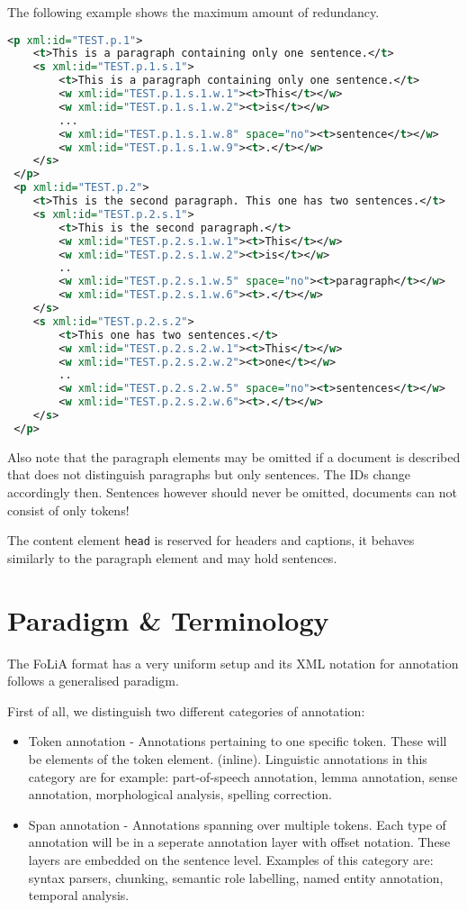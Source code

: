 \documentclass[a4paper,12pt]{report}
\begin{document}
The following example shows the maximum amount of redundancy.

\begin{lstlisting}[language=xml]
 <p xml:id="TEST.p.1">
    <t>This is a paragraph containing only one sentence.</t>
    <s xml:id="TEST.p.1.s.1">        
        <t>This is a paragraph containing only one sentence.</t>
        <w xml:id="TEST.p.1.s.1.w.1"><t>This</t></w>
        <w xml:id="TEST.p.1.s.1.w.2"><t>is</t></w>
        ...
        <w xml:id="TEST.p.1.s.1.w.8" space="no"><t>sentence</t></w>
        <w xml:id="TEST.p.1.s.1.w.9"><t>.</t></w>
    </s>
 </p>
 <p xml:id="TEST.p.2">
    <t>This is the second paragraph. This one has two sentences.</t>
    <s xml:id="TEST.p.2.s.1">
        <t>This is the second paragraph.</t>
        <w xml:id="TEST.p.2.s.1.w.1"><t>This</t></w>
        <w xml:id="TEST.p.2.s.1.w.2"><t>is</t></w>    
        ..
        <w xml:id="TEST.p.2.s.1.w.5" space="no"><t>paragraph</t></w>    
        <w xml:id="TEST.p.2.s.1.w.6"><t>.</t></w>    
    </s>
    <s xml:id="TEST.p.2.s.2">
        <t>This one has two sentences.</t>
        <w xml:id="TEST.p.2.s.2.w.1"><t>This</t></w>
        <w xml:id="TEST.p.2.s.2.w.2"><t>one</t></w>    
        ..
        <w xml:id="TEST.p.2.s.2.w.5" space="no"><t>sentences</t></w>    
        <w xml:id="TEST.p.2.s.2.w.6"><t>.</t></w>    
    </s>
 </p>
\end{lstlisting}

Also note that the paragraph elements may be omitted if a document is described that does not distinguish paragraphs but only sentences. The IDs change accordingly then. Sentences however should never be omitted, documents can not consist of only tokens!

The content element \texttt{head} is reserved for headers and captions, it behaves similarly to the paragraph element and may hold sentences.

\section{Paradigm \& Terminology}
\label{sec:paradigm}

The FoLiA format has a very uniform setup and its XML notation for annotation follows a generalised paradigm.

First of all, we distinguish two different categories of annotation:

\begin{itemize}
\item Token annotation - Annotations pertaining to one specific token. These will be elements of the token element. (inline). Linguistic annotations in this category are for example: part-of-speech annotation, lemma annotation, sense annotation, morphological analysis, spelling correction.
\item Span annotation - Annotations spanning over multiple tokens. Each type of annotation will be in a seperate annotation layer with offset notation. These layers are embedded on the sentence level. Examples of this category are: syntax parsers, chunking, semantic role labelling, named entity annotation, temporal analysis.
\end{itemize}
\end{document}
